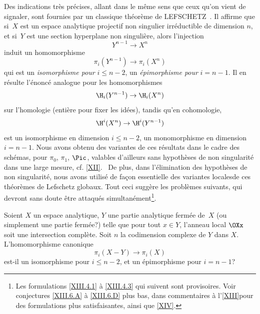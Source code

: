 Des indications tr\`es pr\'ecises, allant dans le m\^eme sens que ceux qu'on vient de signaler, sont fournies par un classique th\'eor\`eme de LEFSCHETZ~\cite{XIII.7}. Il affirme que si~$X$ est un espace analytique projectif non singulier irr\'eductible de dimension $n$, et si~$Y$ est une section hyperplane non singuli\`ere, alors l'injection
$$Y^{n-1}\to X^n$$
induit un homomorphisme
$$
\pi_i(Y^{n-1})\to \pi_i(X^n)$$
qui est un \emph{isomorphisme pour} $i\le n-2$, un \emph{épimorphisme pour} $i=n-1$. Il en r\'esulte l'\'enonc\'e analogue pour les homomorphismes
$$
\H_i(Y^{n-1})\to \H_i(X^n)$$
sur l'homologie (enti\`ere pour fixer les id\'ees), tandis qu'en cohomologie,
$$
\H^i(X^n)\to\H^i(Y^{n-1})
$$
est un isomorphisme en dimension $i\le n-2$, un monomorphisme en dimension $i=n-1$. Nous avons obtenu des variantes de ces r\'esultats dans le cadre des sch\'emas, pour $\pi_0$, $\pi_1$, $\Pic$, valables d'ailleurs sans hypoth\`eses de non singularit\'e dans une large mesure, cf. \Exp \ref{XII}. \ De plus, dans l'\'elimination des hypoth\`eses de non singularit\'e, nous avons utilis\'e de fa\c con essentielle des variantes \og locales\fg de ces th\'eor\`emes de Lefschetz globaux. Tout ceci sugg\`ere les probl\`emes suivants, qui devront sans doute \^etre attaqu\'es simultan\'ement\footnote{Les formulations \ref{XIII.4.1} \`a \ref{XIII.4.3} qui suivent sont provisoires. Voir conjectures \ref{XIII.6.A} \`a \ref{XIII.6.D} plus bas, dans \og commentaires \`a l'\Exp \ref{XIII}\fg pour des formulations plus satisfaisantes, ainsi que \Exp \ref{XIV}.}.

\begin{probleme} \label{XIII.4.1}
Soient $X$ un espace analytique, $Y$ une partie analytique ferm\'ee de~$X$ (ou simplement une partie ferm\'ee?) telle que pour tout $x\in Y$, l'anneau local $\OXx$ soit une intersection compl\`ete. Soit $n$ la codimension complexe de $Y$ dans $X$. L'homomorphisme canonique
$$
\pi_i(X-Y)\to \pi_i(X)$$
est-il un isomorphisme pour $i\le n-2$, et un \'epimorphisme pour $i=n-1$?
\end{probleme}

